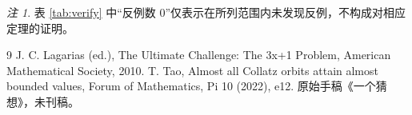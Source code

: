 \documentclass[11pt]{article}
\theoremstyle{definition}\newtheorem{definition}[theorem]{定义}
\theoremstyle{definition}\newtheorem{conjecture}[theorem]{猜想}
\theoremstyle{remark}\newtheorem{remark}[theorem]{注}
\begin{document}
\begin{remark}\label{rem:Averify}
表 \ref{tab:verify} 中“反例数 0”仅表示在所列范围内未发现反例，不构成对相应定理的证明。
\end{remark}
\begin{thebibliography}{9}
 J. C. Lagarias (ed.), The Ultimate Challenge: The 3x+1 Problem, American Mathematical Society, 2010.
 T. Tao, Almost all Collatz orbits attain almost bounded values, Forum of Mathematics, Pi 10 (2022), e12.
 原始手稿《一个猜想》，未刊稿。
\end{thebibliography}
\end{document}
